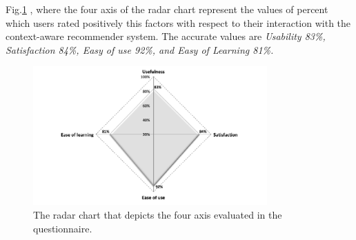 Fig.\ref{fig:radial} , where the four axis of the radar chart represent the
values of percent which users rated positively this factors with respect to
their interaction with the context-aware recommender system.  The accurate values are
\textit{Usability 83\%, Satisfaction 84\%, Easy of use  92\%, and Easy of Learning 81\%.}
\begin{figure}
\centering
\small
\captionsetup{font=footnotesize}
\includegraphics[width=0.8\textwidth]{img/radial.png}%
\caption{\small{The radar chart that depicts the four axis evaluated in the questionnaire.}}
\label{fig:radial}   
\end{figure}


